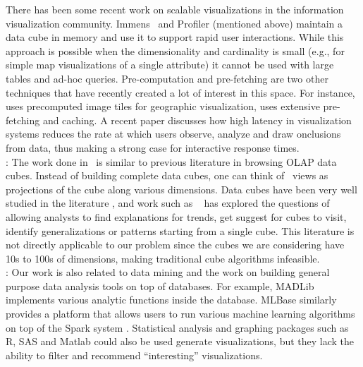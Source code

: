 There has been some recent work on
scalable visualizations in the information visualization community. Immens~\cite{2013-immens} and Profiler (mentioned above) maintain a data cube in memory and use it to support rapid user interactions. While this approach is possible when the dimensionality
and cardinality is small (e.g., for simple map visualizations of a single
attribute) it cannot be used with large tables and ad-hoc queries.
Pre-computation and pre-fetching are two other techniques that have recently
created a lot of interest in this space. For instance, \cite{hotmap} uses
precomputed image tiles for geographic visualization,
\cite{doshi2003prefetching} uses extensive pre-fetching and caching. 
A recent paper \cite{2014-viz-latency} discusses how high
latency in visualization systems reduces the rate at which users observe,
analyze and draw onclusions from data, thus making a strong case for
interactive response times.
\\  


:
The work done in \VizRecDB\ is similar to previous literature in
browsing OLAP data cubes. 
Instead of building complete data cubes,
one can think of \VizRecDB\ views as projections of the cube along various
dimensions.
 Data cubes have been very well studied in the literature
\cite{DBLP:conf/SIGMOD/HarinarayanRU96, DBLP:jounral/DMKD/GrayCBLR97}, and work such as
~\cite{DBLP:conf/vldb/Sarawagi99, DBLP:conf/vldb/SatheS01,
DBLP:conf/vldb/Sarawagi00, DBLP:conf/SIGKDD/OrdonezC09} has explored the
questions of allowing analysts to find explanations for trends, get suggest for
cubes to visit, identify generalizations or patterns starting from a single
cube. 
This literature is not directly applicable to our problem since the cubes we
are considering have 10s to 100s of dimensions, making traditional cube
algorithms infeasible. \\

:
Our work is also related to data mining and the work on building general purpose
data analysis tools on top of databases. 
For example, MADLib \cite{DBLP:conf/VLDB/HellersteinRSWF12}
implements various analytic functions inside the database. 
MLBase similarly
\cite{DBLP:conf/CIDR/KraskaTDGFJ2013} provides a platform that allows users to
run various machine learning algorithms on top of the Spark system
\cite{DBLP:conf/SCC/ZahariaCFSS10}.
Statistical analysis and graphing packages such as R, SAS and Matlab could also
be used generate visualizations, but they lack the ability to filter and
recommend ``interesting'' visualizations. \\


